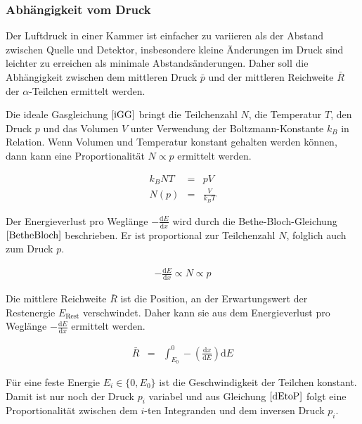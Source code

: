 \documentclass[12pt,a4paper]{scrartcl}
\numberwithin{equation}{section} %
\renewcommand{\[}{} %
\renewcommand{\]}{\noindent} %
\begin{document}
\hypertarget{abhuxe4ngigkeit-vom-druck}{%
\subsubsection{Abhängigkeit vom Druck}\label{abhuxe4ngigkeit-vom-druck}}

Der Luftdruck in einer Kammer ist einfacher zu variieren als der Abstand
zwischen Quelle und Detektor, insbesondere kleine Änderungen im Druck
sind leichter zu erreichen als minimale Abstandsänderungen. Daher soll
die Abhängigkeit zwischen dem mittleren Druck \(\bar p\) und der
mittleren Reichweite \(\bar R\) der \(\alpha\)-Teilchen ermittelt
werden.

Die ideale Gasgleichung \(\eqref{iGG}\) bringt die Teilchenzahl \(N\),
die Temperatur \(T\), den Druck \(p\) und das Volumen \(V\) unter
Verwendung der Boltzmann-Konstante \(k_B\) in Relation. Wenn Volumen und
Temperatur konstant gehalten werden können, dann kann eine
Proportionalität \(N\propto p\) ermittelt werden.

\[
\begin{eqnarray}
    k_B N T &=& pV \label{iGG} \\
    N(p) &=& \frac{V}{k_B T}
\end{eqnarray}
\]

Der Energieverlust pro Weglänge \(-\frac{\mathrm dE}{\mathrm dx}\) wird
durch die Bethe-Bloch-Gleichung \(\eqref{BetheBloch}\) beschrieben. Er
ist proportional zur Teilchenzahl \(N\), folglich auch zum Druck \(p\).

\[
\begin{eqnarray}
    -\frac{\mathrm dE}{\mathrm dx}\propto N\propto p \label{dEtoP}
\end{eqnarray}
\]

Die mittlere Reichweite \(\bar R\) ist die Position, an der
Erwartungswert der Restenergie \(E_\mathrm{Rest}\) verschwindet. Daher
kann sie aus dem Energieverlust pro Weglänge
\(-\frac{\mathrm dE}{\mathrm dx}\) ermittelt werden.

\[
\begin{eqnarray}
    \bar{R} &=&
        \int_{E_0}^{0} -\left(\frac{\mathrm dx}{\mathrm dE}\right) \mathrm dE
\end{eqnarray}
\]

Für eine feste Energie \(E_i \in \{0, E_0\}\) ist die Geschwindigkeit
der Teilchen konstant. Damit ist nur noch der Druck \(p_i\) variabel und
aus Gleichung \(\eqref{dEtoP}\) folgt eine Proportionalität zwischen dem
\(i\)-ten Integranden und dem inversen Druck \(p_i\).
\end{document}
